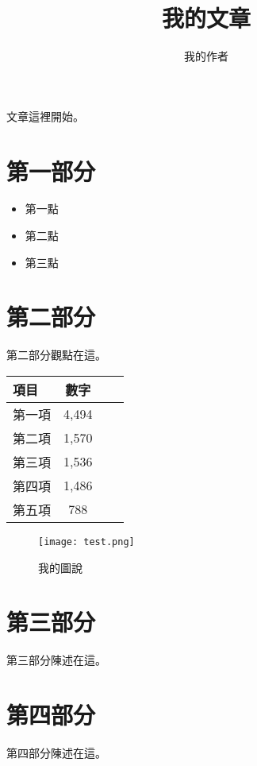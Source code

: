 \documentclass[a4paper, 12pt]{article}
\begin{document}
\begin{CJK}{UTF8}{bsmi}

\title{我的文章} 
\author{我的作者}
\maketitle
\begin{large}
文章這裡開始。
\section{第一部分}
\begin{itemize}
 \item 第一點
 \item 第二點
 \item 第三點
\end{itemize}

\section{第二部分}
第二部分觀點在這。

\begin{center}
 \begin{tabular}{lccc}
 \hline
 項目& 數字\\
 \hline
 第一項&	4,494\\
 第二項& 	1,570\\
 第三項&	1,536\\
 第四項&	1,486\\
 第五項&	788\\
 \hline
\end{tabular}\end{center}

\begin{figure}
 \begin{center}
  \texttt{[image: test.png]}
  \caption{我的圖說}
 \end{center}
\end{figure}

\section{第三部分}
第三部分陳述在這。

\section{第四部分}
第四部分陳述在這。

\end{large}
\end{CJK}
\end{document}
